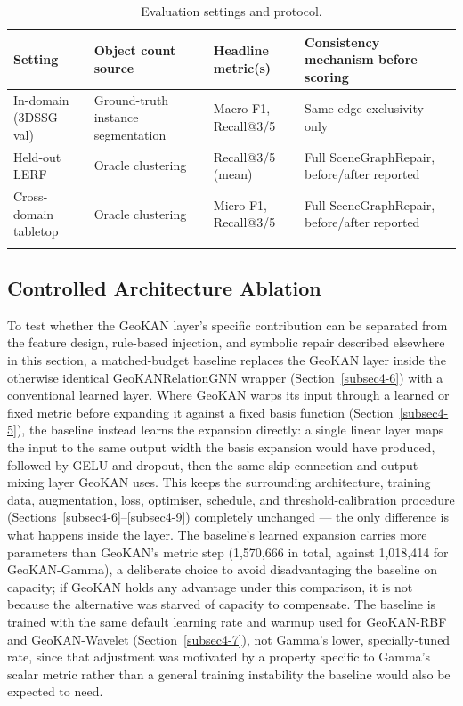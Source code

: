 \documentclass[sn-mathphys,Numbered]{sn-jnl}
\begin{document}
\begin{table}[htbp]
\centering
\caption{Evaluation settings and protocol.}\label{tab8}
\small
\begin{tabular}{@{}p{2.2cm}p{2.4cm}p{2cm}p{3.4cm}@{}}
\toprule
Setting & Object count source & Headline metric(s) & Consistency mechanism before scoring \\
\midrule
In-domain (3DSSG val) & Ground-truth instance segmentation & Macro F1, Recall@3/5 & Same-edge exclusivity only \\
\midrule
Held-out LERF & Oracle clustering & Recall@3/5 (mean) & Full SceneGraphRepair, before/after reported \\
\midrule
Cross-domain tabletop & Oracle clustering & Micro F1, Recall@3/5 & Full SceneGraphRepair, before/after reported \\
\botrule
\end{tabular}
\end{table}

\FloatBarrier
\subsection{Controlled Architecture Ablation}\label{subsec4-10}

To test whether the GeoKAN layer's specific contribution can be separated from the feature design, rule-based injection, and symbolic repair described elsewhere in this section, a matched-budget baseline replaces the GeoKAN layer inside the otherwise identical GeoKANRelationGNN wrapper (Section~\ref{subsec4-6}) with a conventional learned layer. Where GeoKAN warps its input through a learned or fixed metric before expanding it against a fixed basis function (Section~\ref{subsec4-5}), the baseline instead learns the expansion directly: a single linear layer maps the input to the same output width the basis expansion would have produced, followed by GELU and dropout, then the same skip connection and output-mixing layer GeoKAN uses. This keeps the surrounding architecture, training data, augmentation, loss, optimiser, schedule, and threshold-calibration procedure (Sections~\ref{subsec4-6}--\ref{subsec4-9}) completely unchanged --- the only difference is what happens inside the layer. The baseline's learned expansion carries more parameters than GeoKAN's metric step (1,570,666 in total, against 1,018,414 for GeoKAN-Gamma), a deliberate choice to avoid disadvantaging the baseline on capacity; if GeoKAN holds any advantage under this comparison, it is not because the alternative was starved of capacity to compensate. The baseline is trained with the same default learning rate and warmup used for GeoKAN-RBF and GeoKAN-Wavelet (Section~\ref{subsec4-7}), not Gamma's lower, specially-tuned rate, since that adjustment was motivated by a property specific to Gamma's scalar metric rather than a general training instability the baseline would also be expected to need.
\end{document}
